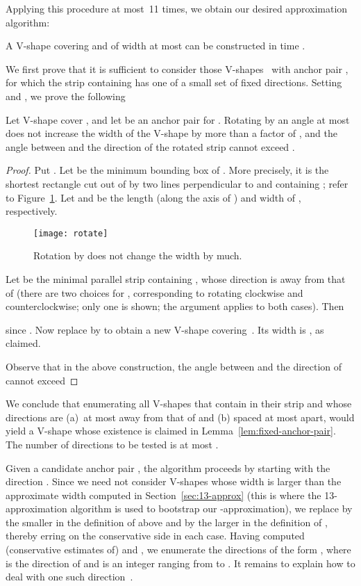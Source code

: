 \documentclass{llncs}
\begin{document}
Applying this procedure at most~11 times, we obtain our desired
approximation algorithm:
\begin{theorem}
  A V-shape covering  and of width at most  can be
  constructed in time .
\end{theorem}

We first prove that it is sufficient to consider those V-shapes~
with anchor pair , for which the strip containing  has one
of a small set of fixed directions.  Setting  and
, we
prove the following

\begin{lemma}
  \label{lem:rotate-strip}
  Let V-shape  cover , and let  be an anchor pair for
  .  Rotating  by an angle at most  does not
  increase the width of the V-shape by more than a factor of
  , and the angle between  and the direction of the
  rotated strip cannot exceed .
\end{lemma}

\begin{proof}
  Put .  Let  be the minimum bounding box of .  More precisely, it is the shortest rectangle cut out of 
  by two lines perpendicular to  and containing ;
  refer to Figure~\ref{fig:rotated}.  Let  and  be the
  length (along the axis of ) and width of , respectively.
\begin{figure}
 \centering
    \texttt{[image: rotate]}
    \caption{Rotation by  does not change the width by much.}
    \label{fig:rotated}
\end{figure}
Let  be the minimal parallel strip containing , whose
  direction is  away from that of  (there are two choices for , corresponding to
  rotating clockwise and counterclockwise; only one is shown; the
  argument applies to both cases).  
  Then
  
  since .  Now
  replace  by  to obtain a new V-shape  covering~.
  Its width is , as
  claimed.

  Observe that in the above construction, the angle between  and
  the direction of  cannot exceed
   \hfill 
  \end{proof} 

We conclude that enumerating all V-shapes that contain  in their
strip  and whose directions are (a)~at most  away from
that of  and (b) spaced at most  apart, would yield a
V-shape whose existence is claimed in
Lemma~\ref{lem:fixed-anchor-pair}.  The number of directions to be
tested is at most .

Given a candidate anchor pair , the algorithm proceeds by
starting with the direction .  Since we need not consider V-shapes
whose width is larger than the approximate width  computed in
Section~\ref{sec:13-approx} (this is where the 13-approximation
algorithm is used to bootstrap our -approximation), we
replace  by the smaller  in the
definition of  above and by the larger  in the
definition of , thereby erring on the conservative side in
each case.  Having computed (conservative estimates of)  and
, we enumerate the  directions of the form
, where  is the direction
of  and  is an integer ranging from  to .  It remains to
explain how to deal with one such direction~.
\end{document}
